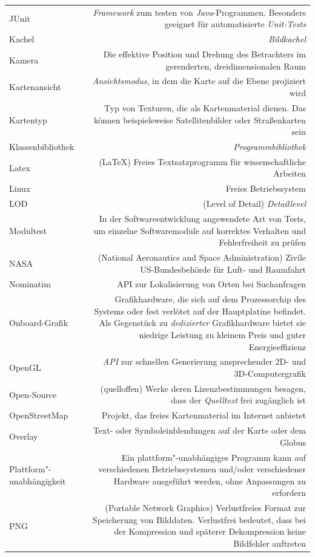 \documentclass[10pt]{scrreprt}
\newcommand{\textref}[1]{\mbox{\raisebox{0.1ex}{\small$\rightarrow$ }\textit{#1}}}
\begin{document}
\begin{longtabu}{L{0.35} R{1.65}}
JUnit & \textref{Framework} zum testen von \textref{Java}-Programmen. Besonders geeignet für automatisierte \textref{Unit-Tests}\\
Kachel & \textref{Bildkachel}\\
Kamera & Die effektive Position und Drehung des Betrachters im gerenderten, dreidimensionalen Raum\\
Kartenansicht & \textref{Ansichtsmodus}, in dem die Karte auf die Ebene projiziert wird\\
Kartentyp & Typ von Texturen, die als Kartenmaterial dienen. Das können beispielsweise Satellitenbilder oder Straßenkarten sein\\
Klassenbibliothek & \textref{Programmbibliothek}\\
Latex & (\LaTeX) Freies Textsatzprogramm für wissenschaftliche Arbeiten\\
Linux & Freies Betriebssystem\\
LOD & (Level of Detail) \textref{Detaillevel} \\
Modultest & In der Softwareentwicklung angewendete Art von Tests, um einzelne Softwaremodule auf korrektes Verhalten und Fehlerfreiheit zu prüfen\\
NASA & (National Aeronautics and Space Administration) Zivile US-Bundesbehörde für Luft- und Raumfahrt\\
Nominatim & API zur Lokalisierung von Orten bei Suchanfragen\\
Onboard-Grafik & Grafikhardware, die sich auf dem Prozessorchip des Systems oder fest verlötet auf der Hauptplatine befindet. Als Gegenstück zu \textit{dedizierter} Grafikhardware bietet sie niedrige Leistung zu kleinem Preis und guter Energieeffizienz\\
OpenGL & \textref{API} zur schnellen Generierung ansprechender 2D- und 3D-Computergrafik\\
Open-Source & (quelloffen) Werke deren Lizenzbestimmungen besagen, dass der \textref{Quelltext} frei zugänglich ist\\
OpenStreetMap & Projekt, das freies Kartenmaterial im Internet anbietet\\
Overlay & Text- oder Symboleinblendungen auf der Karte oder dem Globus\\
Plattform"-unabhängigkeit & Ein plattform"-unabhängiges Programm kann auf verschiedenen Betriebssystemen  und/oder verschiedener Hardware ausgeführt werden, ohne Anpassungen zu erfordern\\
PNG & (Portable Network Graphics) Verlustfreies Format zur Speicherung von Bilddaten. Verlustfrei bedeutet, dass bei der Kompression und späterer Dekompression keine Bildfehler auftreten\\

\end{longtabu}
\end{document}
